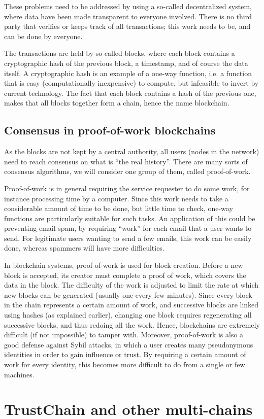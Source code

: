 These problems need to be addressed by using a so-called decentralized system, 
where data have been made transparent to everyone involved. 
There is no third party that verifies or keeps track of all transactions; 
this work needs to be, and can be done by everyone. 

The transactions are held by so-called blocks, 
where each block contains a cryptographic hash of the previous block, a timestamp, and of course the data itself. 
A cryptographic hash is an example of a one-way function, 
i.e. a function that is easy (computationally inexpensive) to compute, 
but infeasible to invert by current technology. 
The fact that each block contains a hash of the previous one, 
makes that all blocks together form a chain, hence the name blockchain. 

\subsection{Consensus in proof-of-work blockchains}
As the blocks are not kept by a central authority, all users (nodes in the network) need to reach consensus on what is ``the real history''. 
There are many sorts of consensus algorithms, 
we will consider one group of them, called proof-of-work. 

Proof-of-work is in general requiring the service requester to do some work, 
for instance processing time by a computer. 
Since this work needs to take a considerable amount of time to be done, 
but little time to check, 
one-way functions are particularly suitable for such tasks. 
An application of this could be preventing email spam, by requiring ``work'' for each email that a user wants to send. 
For legitimate users wanting to send a few emails, 
this work can be easily done, 
whereas spammers will have more difficulties. 

In blockchain systems, proof-of-work is used for block creation. 
Before a new block is accepted, 
its creator must complete a proof of work, 
which covers the data in the block. 
The difficulty of the work is adjusted to limit the rate at which new blocks can be generated (usually one every few minutes). 
Since every block in the chain represents a certain amount of work, and successive blocks are linked using hashes (as explained earlier), 
changing one block requires regenerating all successive blocks, and thus redoing all the work. 
Hence, blockchains are extremely difficult (if not impossible) to tamper with. 
Moreover, proof-of-work is also a good defense against Sybil attacks, 
in which a user creates many pseudonymous identities in order to gain influence or trust. 
By requiring a certain amount of work for every identity, 
this becomes more difficult to do from a single or few machines. 

\section{TrustChain and other multi-chains}
